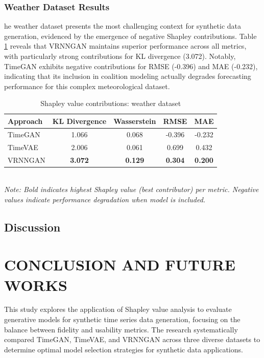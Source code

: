 \documentclass{article}
\begin{document}
\subsubsection{Weather Dataset Results}
he weather dataset presents the most challenging context for synthetic data generation, evidenced by the emergence of negative Shapley contributions. Table \ref{tab:shapley_weather} reveals that VRNNGAN maintains superior performance across all metrics, with particularly strong contributions for KL divergence (3.072). Notably, TimeGAN exhibits negative contributions for RMSE (-0.396) and MAE (-0.232), indicating that its inclusion in coalition modeling actually degrades forecasting performance for this complex meteorological dataset.

\begin{table}[H]
\centering
\caption{Shapley value contributions: weather dataset}
\label{tab:shapley_weather}
\begin{tabular}{lcccc}
\toprule
\textbf{Approach} & \textbf{KL Divergence} & \textbf{Wasserstein} & \textbf{RMSE} & \textbf{MAE} \\
\midrule
TimeGAN & 1.066 & 0.068 & -0.396 & -0.232 \\
TimeVAE & 2.006 & 0.061 & 0.699 & 0.432 \\
VRNNGAN & \textbf{3.072} & \textbf{0.129} & \textbf{0.304} & \textbf{0.200} \\
\bottomrule
\end{tabular}
\\[0.5em]
\footnotesize
\textit{Note: Bold indicates highest Shapley value (best contributor) per metric. Negative values indicate performance degradation when model is included.}
\end{table}


\subsection{Discussion}
\newpage
\section{CONCLUSION AND FUTURE WORKS}
This study explores the application of Shapley value analysis to evaluate generative models for synthetic time series data generation, focusing on the balance between fidelity and usability metrics. The research systematically compared TimeGAN, TimeVAE, and VRNNGAN across three diverse datasets to determine optimal model selection strategies for synthetic data applications. 
\end{document}
